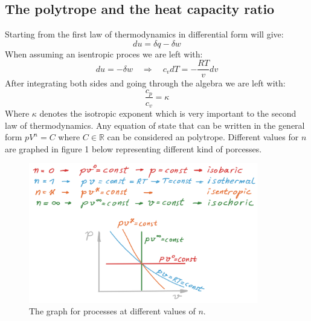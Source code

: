 \documentclass[11pt, a4paper]{article}
\newcommand*{\R}{\ensuremath{\mathbb{R}}}
\begin{document}
\subsection{The polytrope and the heat capacity ratio}
Starting from the first law of thermodynamics in differential form will give:
\begin{equation*}
  du = \delta q - \delta w
\end{equation*}
When assuming an isentropic proces we are left with:
\begin{equation*}
  du = - \delta w \quad \Rightarrow \quad c_v dT = -\frac{RT}{v}dv
\end{equation*}
After integrating both sides and going through the algebra we are left with:
\begin{equation}
  \frac{c_p}{c_v} = \kappa
\end{equation}
Where $\kappa$ denotes the isotropic exponent which is very important to the second law of thermodynamics. Any equation of state that can be written in the general form $pV^n = C$ where $C \in \R$ can be considered an polytrope. Different values for $n$ are graphed in figure 1 below representing different kind of porcesses.
\begin{figure}[h]
  \centerline{\includegraphics[width=100mm]{images/polytropic.png}}
  \caption{The graph for processes at different values of $n$.}
\end{figure}
\end{document}
